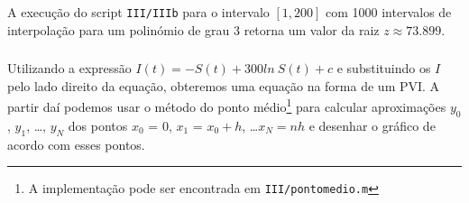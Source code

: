 \documentclass[portuguese, a4paper]{article}
\newcommand\tu[0]{\textunderscore}
\begin{document}
		\par
		A execução do script \texttt{III/III\tu b} para o intervalo $[1, 200]$
		com 1000 intervalos de interpolação para um polinómio de grau 3 retorna
		um valor da raiz $z \approx 73.899$.






		\subsubsection{} \label{sec:III.2c)}
		\par
		Utilizando a expressão $I(t) = -S(t) + 300ln~S(t) + c$ e substituindo
		os $I$ pelo lado direito da equação, obteremos uma equação na forma de
		um PVI\@. A partir daí podemos usar o método do ponto médio\footnote{A
		implementação pode ser encontrada em \texttt{III/ponto\tu medio.m}}
		para calcular aproximações $y_0$, $y_1$, \ldots, $y_N$ dos pontos $x_0$
		= 0, $x_1$ = $x_0 + h$, \ldots $x_N= nh$ e desenhar o gráfico de acordo
		com esses pontos.
\end{document}
